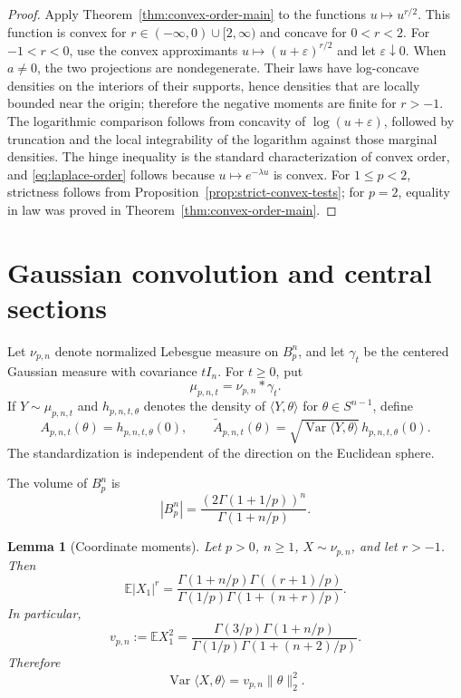 \documentclass[pdflatex,sn-mathphys-num]{sn-jnl}
\numberwithin{equation}{section}
\theoremstyle{thmstyleone}
\newtheorem{lemma}[theorem]{Lemma}
\theoremstyle{thmstylethree}
\newcommand{\E}{\mathbb{E}}
\DeclareMathOperator{\Var}{Var}
\newcommand{\1}{\mathbf{1}}
\newcommand{\sphere}{S^{n-1}}
\begin{document}
\begin{proof}
Apply Theorem~\ref{thm:convex-order-main} to the functions
$u\mapsto u^{r/2}$. This function is convex for
$r\in(-\infty,0)\cup[2,\infty)$ and concave for $0<r<2$. For
$-1<r<0$, use the convex approximants
$u\mapsto(u+\varepsilon)^{r/2}$ and let $\varepsilon\downarrow0$.
When $a\ne0$, the two projections are nondegenerate. Their laws have
log-concave densities on the interiors of their supports, hence densities
that are locally bounded near the origin; therefore the negative moments
are finite for $r>-1$. The logarithmic comparison
follows from concavity of $\log(u+\varepsilon)$, followed by truncation
and the local integrability of the logarithm against those marginal
densities. The hinge inequality is the standard characterization of
convex order, and \eqref{eq:laplace-order} follows because
$u\mapsto e^{-\lambda u}$ is convex. For $1\le p<2$, strictness follows from
Proposition~\ref{prop:strict-convex-tests}; for $p=2$, equality in law
was proved in Theorem~\ref{thm:convex-order-main}.
\end{proof}

\section{Gaussian convolution and central sections}\label{sec:applications}

Let $\nu_{p,n}$ denote normalized Lebesgue measure on $B_p^n$, and let
$\gamma_t$ be the centered Gaussian measure with covariance $tI_n$.
For $t\ge0$, put
\[
 \mu_{p,n,t}=\nu_{p,n}*\gamma_t.
\]
If $Y\sim\mu_{p,n,t}$ and $h_{p,n,t,\theta}$ denotes the density of
$\langle Y,\theta\rangle$ for $\theta\in\sphere$, define
\[
 A_{p,n,t}(\theta)=h_{p,n,t,\theta}(0),
 \qquad
 \widetilde A_{p,n,t}(\theta)
 =
 \sqrt{\Var\langle Y,\theta\rangle}\,
 h_{p,n,t,\theta}(0).
\]
The standardization is independent of the direction on the Euclidean
sphere.

The volume of $B_p^n$ is
\begin{equation}\label{eq:volume-bp}
 |B_p^n|=\frac{(2\Gamma(1+1/p))^n}{\Gamma(1+n/p)}.
\end{equation}

\begin{lemma}[Coordinate moments]\label{lem:moments}
Let $p>0$, $n\ge1$, $X\sim\nu_{p,n}$, and let $r>-1$. Then
\begin{equation}\label{eq:coordinate-moment}
 \E |X_1|^r
 =\frac{\Gamma(1+n/p)\Gamma((r+1)/p)}
 {\Gamma(1/p)\Gamma(1+(n+r)/p)}.
\end{equation}
In particular,
\begin{equation}\label{eq:variance-vpn}
 v_{p,n}:=\E X_1^2
 =\frac{\Gamma(3/p)\Gamma(1+n/p)}
 {\Gamma(1/p)\Gamma(1+(n+2)/p)}.
\end{equation}
Therefore
\[
 \Var \langle X,\theta\rangle=v_{p,n}\lVert\theta\rVert_2^2.
\]
\end{lemma}
\end{document}
